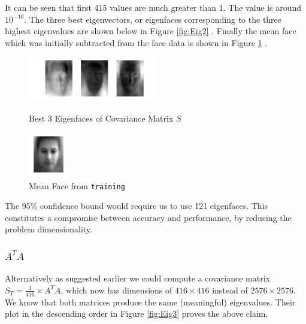 \documentclass[10pt,twocolumn,letterpaper]{article}
\begin{document}
It can be seen that first 415 values are much greater than 1. The  value is around $10^{-10}$. The three best eigenvectors, or eigenfaces corresponding to the three highest eigenvalues are shown below in Figure \ref{fig:Eig2} . Finally the mean face which was initially subtracted from the face data is shown in Figure \ref{fig:Mean} .


\begin{figure}[H]

\centering
\includegraphics[width=0.5\textwidth]{../results/Q1A_PCA_Eigenfaces}

  \caption{Best 3 Eigenfaces of Covariance Matrix $S$ \label{fig:Eig2}}

\centering
\includegraphics[width=0.15\textwidth]{../results/Q1A_PCA_Mean}

  \caption{Mean Face from {\tt\small training} \label{fig:Mean}}

\end{figure}


The 95\% confidence bound would require us to use 121 eigenfaces. This constitutes a compromise between accuracy and performance, by reducing the problem dimensionality.
\subsubsection{\boldmath$A^TA$} \label{sec:ata}
Alternatively as suggested earlier we could compute a covariance matrix $S_T = \frac{1}{416} \times A^TA$, which now has dimensions of $416 \times 416$ instead of $2576 \times 2576$. We know \cite{Data Mining} that both matrices produce the same (meaningful) eigenvalues. Their plot in the  descending order in Figure \ref{fig:Eig3} proves the above claim.
\end{document}

